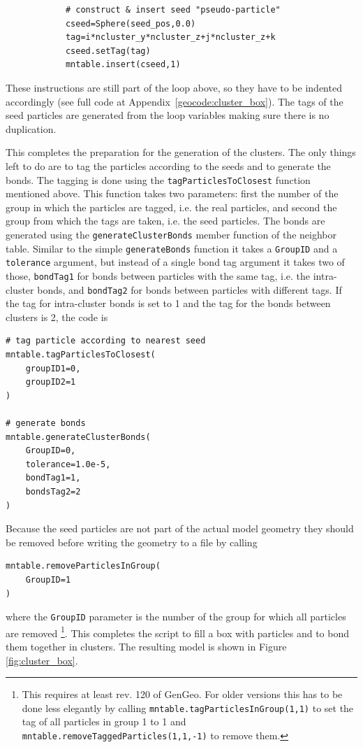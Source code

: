 \begin{verbatim}      
            # construct & insert seed "pseudo-particle"
            cseed=Sphere(seed_pos,0.0)
            tag=i*ncluster_y*ncluster_z+j*ncluster_z+k
            cseed.setTag(tag)
            mntable.insert(cseed,1)
\end{verbatim} 
These instructions are still part of the loop above, so they have to be indented accordingly (see full code at Appendix~\ref{geocode:cluster_box}). The tags of the seed particles are generated from the loop variables making sure there is no duplication.\par
This completes the preparation for the generation of the clusters. The only things left to do are to tag the particles according to the seeds and to generate the bonds. The tagging is done using the \texttt{tagParticlesToClosest} function mentioned above. This function takes two parameters: first the number of the group in which the particles are tagged, i.e. the real particles, and second the group from which the tags are taken, i.e. the seed particles. The bonds are generated using the \texttt{generateClusterBonds} member function of the neighbor table. Similar to the simple \texttt{generateBonds} function it takes a \texttt{GroupID} and a \texttt{tolerance} argument, but instead of a single bond tag argument it takes two of those, \texttt{bondTag1} for bonds between particles with the same tag, i.e. the intra-cluster bonds, and \texttt{bondTag2} for bonds between particles with different tags. If the tag for intra-cluster bonds is set to 1 and the tag for the bonds between clusters is 2, the code is
\begin{verbatim}
# tag particle according to nearest seed
mntable.tagParticlesToClosest(
    groupID1=0,
    groupID2=1
)

# generate bonds
mntable.generateClusterBonds(
    GroupID=0,
    tolerance=1.0e-5,
    bondTag1=1,
    bondsTag2=2
)
\end{verbatim}
Because the seed particles are not part of the actual model geometry they should be removed before writing the geometry to a file by calling 
\begin{verbatim}
mntable.removeParticlesInGroup(
    GroupID=1
)
\end{verbatim} 
where the \texttt{GroupID} parameter is the number of the group for which all particles are removed \footnote{This requires at least rev. 120 of GenGeo. For older versions this has to be done less elegantly by calling \texttt{mntable.tagParticlesInGroup(1,1)} to set the tag of all particles in group 1 to 1 and  \texttt{mntable.removeTaggedParticles(1,1,-1)} to remove them.\footnotemark}.  This completes the script to fill a box with particles and to bond them together in clusters. The resulting model is shown in Figure \ref{fig:cluster_box}. 

